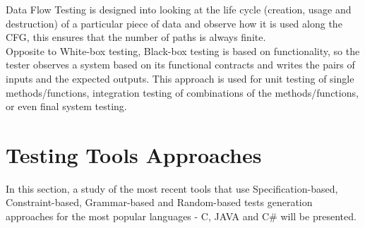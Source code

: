 Data Flow Testing is designed into looking at the life cycle
(creation, usage and destruction) of a particular
piece of data and observe how it is used along the \ac{CFG}, this ensures
that the number of paths is always finite\cite{dataflow}.\\

Opposite to White-box testing, Black-box testing is based on
functionality, so the tester observes a system based
on its functional contracts and writes the pairs of inputs and the
expected outputs.
This approach is used for unit testing of single methods/functions,
integration testing
of combinations of the methods/functions, or even final system testing.\\


\section{Testing Tools Approaches}\label{testingapproaches}
In this section, a study of the most recent tools that use Specification-based, Constraint-based, Grammar-based and Random-based tests generation
approaches for the most popular languages - C, JAVA and C\# will be presented.

